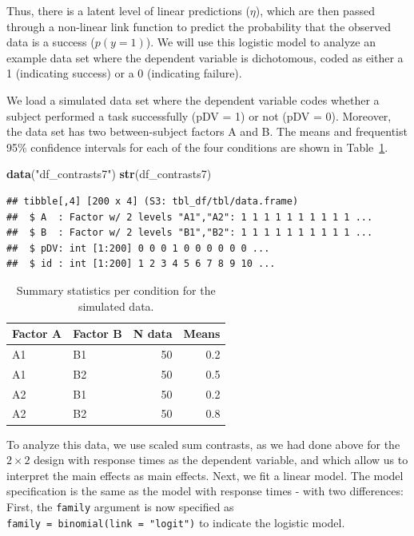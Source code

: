 \documentclass[12pt,]{krantz}
\newenvironment{Shaded}{\begin{snugshade}}{\end{snugshade}}
\newcommand{\KeywordTok}[1]{\textcolor[rgb]{0.13,0.29,0.53}{\textbf{#1}}}
\newcommand{\NormalTok}[1]{#1}
\newcommand{\StringTok}[1]{\textcolor[rgb]{0.31,0.60,0.02}{#1}}
\begin{document}
Thus, there is a latent level of linear predictions (\(\eta\)), which are then passed through a non-linear link function to predict the probability that the observed data is a success (\(p(y = 1)\)). We will use this logistic model to analyze an example data set where the dependent variable is dichotomous, coded as either a 1 (indicating success) or a 0 (indicating failure).

We load a simulated data set where the dependent variable codes whether a subject performed a task successfully (pDV = 1) or not (pDV = 0). Moreover, the data set has two between-subject factors A and B. The means and frequentist 95\% confidence intervals for each of the four conditions are shown in Table~\ref{tab:cTab7Means}.

\begin{Shaded}
\begin{Highlighting}[]
\KeywordTok{data}\NormalTok{(}\StringTok{"df_contrasts7"}\NormalTok{)}
\KeywordTok{str}\NormalTok{(df_contrasts7)}
\end{Highlighting}
\end{Shaded}

\begin{verbatim}
## tibble[,4] [200 x 4] (S3: tbl_df/tbl/data.frame)
##  $ A  : Factor w/ 2 levels "A1","A2": 1 1 1 1 1 1 1 1 1 1 ...
##  $ B  : Factor w/ 2 levels "B1","B2": 1 1 1 1 1 1 1 1 1 1 ...
##  $ pDV: int [1:200] 0 0 0 1 0 0 0 0 0 0 ...
##  $ id : int [1:200] 1 2 3 4 5 6 7 8 9 10 ...
\end{verbatim}

\begin{table}[h]

\caption{\label{tab:cTab7Means}Summary statistics per condition for the simulated data.}
\centering
\begin{tabular}[t]{llrr}
\toprule
Factor A & Factor B & N data & Means\\
\midrule
A1 & B1 & 50 & 0.2\\
A1 & B2 & 50 & 0.5\\
A2 & B1 & 50 & 0.2\\
A2 & B2 & 50 & 0.8\\
\bottomrule
\end{tabular}
\end{table}

To analyze this data, we use scaled sum contrasts, as we had done above for the \(2 \times 2\) design with response times as the dependent variable, and which allow us to interpret the main effects as main effects. Next, we fit a linear model. The model specification is the same as the model with response times - with two differences: First, the \texttt{family} argument is now specified as \texttt{family\ =\ binomial(link\ =\ "logit")} to indicate the logistic model.
\end{document}
